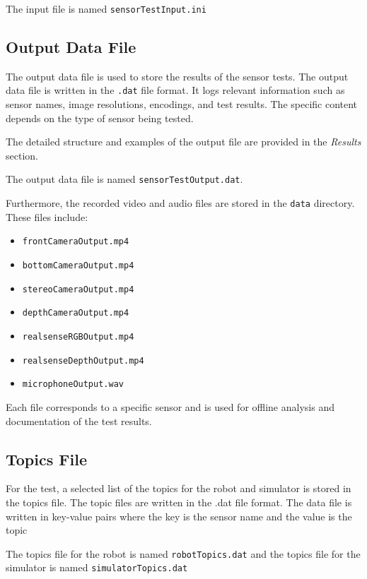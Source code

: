 \documentclass{CSSRforAfrica}
\begin{document}
The input file is named \texttt{sensorTestInput.ini}

\subsection*{Output Data File}

The output data file is used to store the results of the sensor tests. The output data file is written in the \texttt{.dat} file format.  
It logs relevant information such as sensor names, image resolutions, encodings, and test results. The specific content depends on the type of sensor being tested.

The detailed structure and examples of the output file are provided in the \textit{Results} section.

The output data file is named \texttt{sensorTestOutput.dat}.

Furthermore, the recorded video and audio files are stored in the \texttt{data} directory. These files include:

\begin{itemize}[itemsep=1pt, parsep=0pt]
	\item \texttt{frontCameraOutput.mp4}
	\item \texttt{bottomCameraOutput.mp4}
	\item \texttt{stereoCameraOutput.mp4}
	\item \texttt{depthCameraOutput.mp4}
	\item \texttt{realsenseRGBOutput.mp4}
	\item \texttt{realsenseDepthOutput.mp4}
	\item \texttt{microphoneOutput.wav}
\end{itemize}


Each file corresponds to a specific sensor and is used for offline analysis and documentation of the test results.

\subsection*{Topics File}
For the test, a selected list of the topics for the robot and simulator is stored in the topics file. The topic files are written in the .dat file format. 
The data file is written in key-value pairs where the key is the sensor name and the value is the topic 

The topics file for the robot is named \texttt{robotTopics.dat} and the topics file for the simulator is named \texttt{simulatorTopics.dat}
\end{document}
